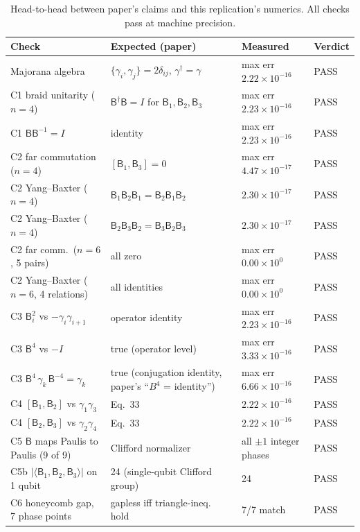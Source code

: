 \documentclass[11pt]{article}
\newcommand{\gam}{\gamma}
\newcommand{\B}{\mathsf{B}}
\begin{document}
\begin{table}[htbp]\centering
\small
\begin{tabular}{@{}l l l l@{}}
\toprule
\textbf{Check} & \textbf{Expected (paper)} & \textbf{Measured} & \textbf{Verdict}\\\midrule
Majorana algebra & $\{\gam_i,\gam_j\}=2\delta_{ij}$, $\gam^\dagger=\gam$ & max err $2.22\!\times\!10^{-16}$ & PASS \\
C1 braid unitarity ($n=4$) & $\B^\dagger\B = I$ for $\B_1,\B_2,\B_3$ & max err $2.23\!\times\!10^{-16}$ & PASS \\
C1 $\B\B^{-1}=I$ & identity & max err $2.23\!\times\!10^{-16}$ & PASS \\
C2 far commutation ($n=4$) & $[\B_1,\B_3]=0$ & max err $4.47\!\times\!10^{-17}$ & PASS \\
C2 Yang--Baxter ($n=4$) & $\B_1\B_2\B_1=\B_2\B_1\B_2$ & $2.30\!\times\!10^{-17}$ & PASS \\
C2 Yang--Baxter ($n=4$) & $\B_2\B_3\B_2=\B_3\B_2\B_3$ & $2.30\!\times\!10^{-17}$ & PASS \\
C2 far comm.\ ($n=6$, 5 pairs) & all zero & max err $0.00\!\times\!10^{0}$ & PASS \\
C2 Yang--Baxter ($n=6$, 4 relations) & all identities & max err $0.00\!\times\!10^{0}$ & PASS \\
C3 $\B_i^2$ vs $-\gam_i\gam_{i+1}$ & operator identity & max err $2.23\!\times\!10^{-16}$ & PASS \\
C3 $\B^4$ vs $-I$ & true (operator level) & max err $3.33\!\times\!10^{-16}$ & PASS \\
C3 $\B^4\,\gam_k\,\B^{-4}=\gam_k$ & true (conjugation identity, paper's ``$B^4$ = identity'') & max err $6.66\!\times\!10^{-16}$ & PASS \\
C4 $[\B_1,\B_2]$ vs $\gam_1\gam_3$ & Eq.~33 & $2.22\!\times\!10^{-16}$ & PASS \\
C4 $[\B_2,\B_3]$ vs $\gam_2\gam_4$ & Eq.~33 & $2.22\!\times\!10^{-16}$ & PASS \\
C5 $\B$ maps Paulis to Paulis (9 of 9) & Clifford normalizer & all $\pm 1$ integer phases & PASS \\
C5b $|\langle\B_1,\B_2,\B_3\rangle|$ on 1 qubit & 24 (single-qubit Clifford group) & 24 & PASS \\
C6 honeycomb gap, 7 phase points & gapless iff triangle-ineq. hold & 7/7 match & PASS \\
\bottomrule
\end{tabular}
\caption{Head-to-head between paper's claims and this replication's numerics. All checks pass at machine precision.\label{tab:results}}
\end{table}
\end{document}
